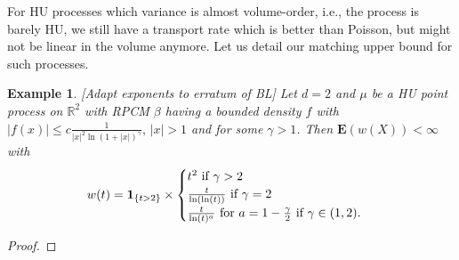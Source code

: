 \documentclass[12pt]{article}
\newtheorem{example}{Example}
\newcommand{\1}{\mathbf{1}}
\begin{document}
{{{{{{For HU processes which variance is almost volume-order, i.e., the process is barely HU, we still have a transport rate which is better than Poisson, but  might not be linear in the volume anymore. Let us detail our matching upper bound for such processes.}
\begin{example}  {[Adapt exponents to erratum of BL]}
Let $ d = 2$ and $ \mu $ be a HU point process on $ \mathbb{R}^{2}$ with RPCM  $ \beta $  having a bounded density $ f$ with $ | f(x) | \leqslant  c\frac{ 1}{ | x | ^{2}\ln(1+| x | )^{\gamma  }}, \, | x | >1$ and for some $\gamma >1$. Then $ \mathbf{E}(w(X))<\infty $ with
\begin{align*}w(t) = \mathbf{1}_{\{t>2\}}\times
\begin{cases}
t^{2}$  if $\gamma >2\\
\frac{ t}{\ln(\ln(t))}$  if $\gamma  = 2\\
\frac{ t}{\ln(t)^{a}}$  for $a =  1-\frac{ \gamma }{2}$  if $\gamma \in ( 1,2).
 \end{cases}
\end{align*}
\end{example}
\begin{proof}




\end{proof}}}}}}
\end{document}
